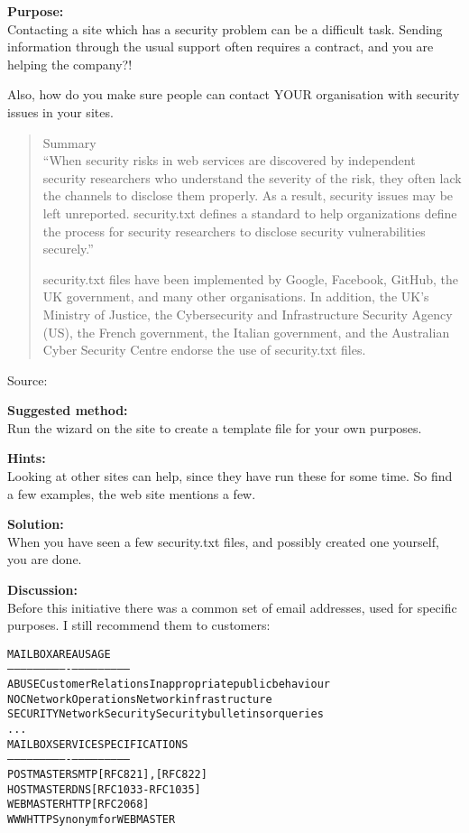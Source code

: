 \documentclass[a4paper,11pt,notitlepage]{report}
\begin{document}
{\bf Purpose:}\\
Contacting a site which has a security problem can be a difficult task. Sending information through the usual support often requires a contract, and you are helping the company?!

Also, how do you make sure people can contact YOUR organisation with security issues in your sites.


\begin{quote}\footnotesize
Summary\\
“When security risks in web services are discovered by independent security researchers who understand the severity of the risk, they often lack the channels to disclose them properly. As a result, security issues may be left unreported. security.txt defines a standard to help organizations define the process for security researchers to disclose security vulnerabilities securely.”


security.txt files have been implemented by Google, Facebook, GitHub, the UK government, and many other organisations. In addition, the UK’s Ministry of Justice, the Cybersecurity and Infrastructure Security Agency (US), the French government, the Italian government, and the Australian Cyber Security Centre endorse the use of security.txt files.
\end{quote}

Source: 


{\bf Suggested method:}\\
Run the wizard on the site to create a template file for your own purposes.


{\bf Hints:}\\
Looking at other sites can help, since they have run these for some time. So find a few examples, the web site mentions a few.

{\bf Solution:}\\
When you have seen a few security.txt files, and possibly created one yourself, you are done.

{\bf Discussion:}\\
Before this initiative there was a common set of email addresses, used for specific purposes. I still recommend them to customers:

\begin{alltt}\footnotesize
MAILBOX       AREA                USAGE
-----------   ----------------    ---------------------------
ABUSE         Customer Relations  Inappropriate public behaviour
NOC           Network Operations  Network infrastructure
SECURITY      Network Security    Security bulletins or queries
...
MAILBOX       SERVICE             SPECIFICATIONS
-----------   ----------------    ---------------------------
POSTMASTER    SMTP                [RFC821], [RFC822]
HOSTMASTER    DNS                 [RFC1033-RFC1035]
WEBMASTER     HTTP                [RFC 2068]
WWW           HTTP                Synonym for WEBMASTER
\end{alltt}
\end{document}
